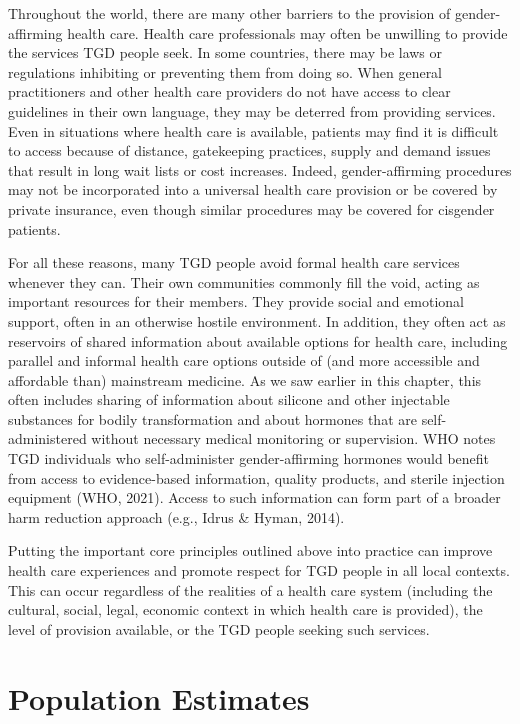 \documentclass[
]{book}
\begin{document}
Throughout the world, there are many other
barriers to the provision of gender-affirming
health care. Health care professionals may often
be unwilling to provide the services TGD people
seek. In some countries, there may be laws or
regulations inhibiting or preventing them from
doing so. When general practitioners and other
health care providers do not have access to clear
guidelines in their own language, they may be
deterred from providing services. Even in situations where health care is available, patients may
find it is difficult to access because of distance,
gatekeeping practices, supply and demand issues
that result in long wait lists or cost increases.
Indeed, gender-affirming procedures may not be
incorporated into a universal health care provision or be covered by private insurance, even
though similar procedures may be covered for
cisgender patients.

For all these reasons, many TGD people avoid
formal health care services whenever they can.
Their own communities commonly fill the void,
acting as important resources for their members.
They provide social and emotional support, often
in an otherwise hostile environment. In addition,
they often act as reservoirs of shared information
about available options for health care, including
parallel and informal health care options outside
of (and more accessible and affordable than)
mainstream medicine. As we saw earlier in this
chapter, this often includes sharing of information
about silicone and other injectable substances for
bodily transformation and about hormones that
are self-administered without necessary medical
monitoring or supervision. WHO notes TGD
individuals who self-administer gender-affirming
hormones would benefit from access to
evidence-based information, quality products, and
sterile injection equipment (WHO, 2021). Access
to such information can form part of a broader
harm reduction approach (e.g., Idrus \&
Hyman, 2014).

Putting the important core principles outlined
above into practice can improve health care experiences and promote respect for TGD people in
all local contexts. This can occur regardless of
the realities of a health care system (including
the cultural, social, legal, economic context in
which health care is provided), the level of provision available, or the TGD people seeking such
services.

\hypertarget{population-estimates}{%
\chapter{Population Estimates}\label{population-estimates}}
\end{document}
